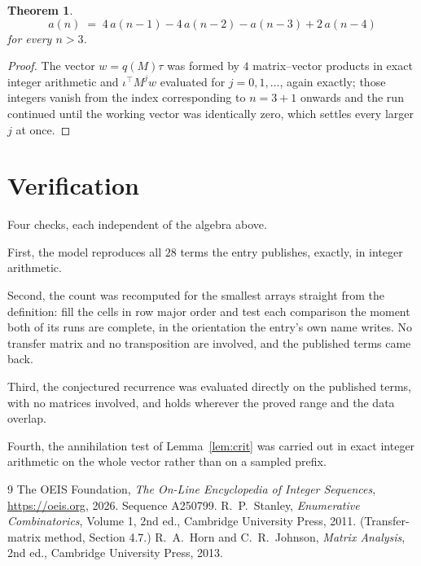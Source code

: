\documentclass[11pt,a4paper]{article}
\theoremstyle{plain}
\newtheorem{theorem}{Theorem}
\theoremstyle{definition}
\begin{document}
\begin{theorem}
\[
a(n)\;=\;4\,a(n-1) - 4\,a(n-2) - a(n-3) + 2\,a(n-4)
\]
for every $n>3$.
\end{theorem}

\begin{proof}
The vector $w=q(M)\tau$ was formed by $4$ matrix--vector products in exact integer
arithmetic and $\iota^{\!\top}M^{j}w$ evaluated for $j=0,1,\dots$, again exactly; those
integers vanish from the index corresponding to $n=3+1$ onwards and the run continued
until the working vector was identically zero, which settles every larger $j$ at once.
\end{proof}

\section{Verification}

Four checks, each independent of the algebra above.

First, the model reproduces all $28$ terms the entry publishes, exactly, in integer
arithmetic.

Second, the count was recomputed for the smallest arrays straight from the definition: fill the
cells in row major order and test each comparison the moment both of its runs are complete,
in the orientation the entry's own name writes. No transfer matrix and no transposition are
involved, and the published terms came back.

Third, the conjectured recurrence was evaluated directly on the published terms, with no
matrices involved, and holds wherever the proved range and the data overlap.

Fourth, the annihilation test of Lemma~\ref{lem:crit} was carried out in exact integer
arithmetic on the whole vector rather than on a sampled prefix.

\begin{thebibliography}{9}
 The OEIS Foundation, \emph{The On-Line Encyclopedia of Integer
Sequences}, \url{https://oeis.org}, 2026. Sequence A250799.
 R.~P.~Stanley, \emph{Enumerative Combinatorics}, Volume 1, 2nd ed.,
Cambridge University Press, 2011. (Transfer-matrix method, Section 4.7.)
 R.~A.~Horn and C.~R.~Johnson, \emph{Matrix Analysis}, 2nd ed., Cambridge
University Press, 2013.
\end{thebibliography}
\end{document}
